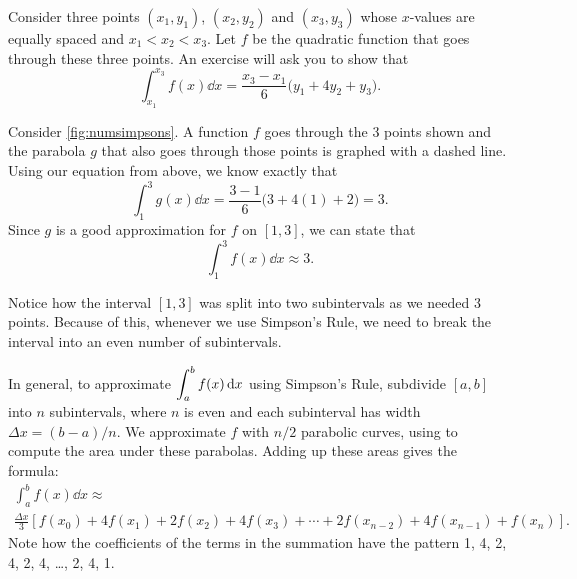Consider three points $(x_1,y_1)$, $(x_2,y_2)$ and $(x_3,y_3)$ whose $x$-values are equally spaced and $x_1<x_2<x_3$. Let $f$ be the quadratic function that goes through these three points. An exercise will ask you to show that 
\begin{equation}
\int_{x_1}^{x_3} f(x)\dd x = \frac{x_3-x_1}{6}\bigl(y_1+4y_2+y_3\bigr).\label{eq:simpsons}
\end{equation}


Consider \autoref{fig:numsimpsons}. A function $f$ goes through the 3 points shown and the parabola $g$ that also goes through those points is graphed with a dashed line. Using our equation from above, we know exactly that
\[\int_1^3 g(x)\dd x = \frac{3-1}{6}\bigl(3+4(1)+2\bigr)= 3.\]
Since $g$ is a good approximation for $f$ on $[1,3]$, we can state that
\[\int_1^3 f(x)\dd x \approx 3.\]

Notice how the interval $[1,3]$ was split into two subintervals as we needed 3 points. Because of this, whenever we use Simpson's Rule, we need to break the interval into an even number of subintervals. 

In general, to approximate $\displaystyle \int_a^b f(x)\operatorname{d}\! x$ using Simpson's Rule, subdivide $[a,b]$ into $n$ subintervals, where $n$ is even and each subinterval has width $\Delta x = (b-a)/n$. We approximate $f$ with $n/2$ parabolic curves, using  to compute the area under these parabolas. Adding up these areas gives the formula:
\begin{multline*}
\int_a^b f(x)\dd x\approx\\
\frac{\Delta x}3
\left[f(x_0)+4f(x_1)+2f(x_2)+4f(x_3)+\dotsb+2f(x_{n-2})+4f(x_{n-1})+f(x_n)\right].
\end{multline*}
Note how the coefficients of the terms in the summation have the pattern 1, 4, 2, 4, 2, 4, \dots, 2, 4, 1.

